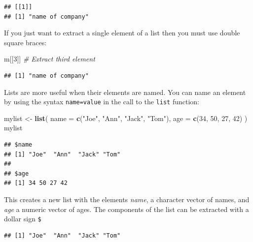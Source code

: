 \documentclass[
]{book}
\newenvironment{Shaded}{\begin{snugshade}}{\end{snugshade}}
\newcommand{\AttributeTok}[1]{\textcolor[rgb]{0.13,0.29,0.53}{#1}}
\newcommand{\CommentTok}[1]{\textcolor[rgb]{0.56,0.35,0.01}{\textit{#1}}}
\newcommand{\DecValTok}[1]{\textcolor[rgb]{0.00,0.00,0.81}{#1}}
\newcommand{\FunctionTok}[1]{\textcolor[rgb]{0.13,0.29,0.53}{\textbf{#1}}}
\newcommand{\NormalTok}[1]{#1}
\newcommand{\OtherTok}[1]{\textcolor[rgb]{0.56,0.35,0.01}{#1}}
\newcommand{\SpecialCharTok}[1]{\textcolor[rgb]{0.81,0.36,0.00}{\textbf{#1}}}
\newcommand{\StringTok}[1]{\textcolor[rgb]{0.31,0.60,0.02}{#1}}
\begin{document}
\begin{verbatim}
## [[1]]
## [1] "name of company"
\end{verbatim}

If you just want to extract a single element of a list then you must use
double square braces:

\begin{Shaded}
\begin{Highlighting}[]
\NormalTok{m[[}\DecValTok{3}\NormalTok{]] }\CommentTok{\# Extract third element}
\end{Highlighting}
\end{Shaded}

\begin{verbatim}
## [1] "name of company"
\end{verbatim}

Lists are more useful when their elements are named. You can name an element
by using the syntax \texttt{name=value} in the call to the \texttt{list} function:

\begin{Shaded}
\begin{Highlighting}[]
\NormalTok{mylist }\OtherTok{\textless{}{-}} \FunctionTok{list}\NormalTok{(}
  \AttributeTok{name =} \FunctionTok{c}\NormalTok{(}\StringTok{"Joe"}\NormalTok{, }\StringTok{"Ann"}\NormalTok{, }\StringTok{"Jack"}\NormalTok{, }\StringTok{"Tom"}\NormalTok{),}
  \AttributeTok{age =} \FunctionTok{c}\NormalTok{(}\DecValTok{34}\NormalTok{, }\DecValTok{50}\NormalTok{, }\DecValTok{27}\NormalTok{, }\DecValTok{42}\NormalTok{)}
\NormalTok{)}
\NormalTok{mylist}
\end{Highlighting}
\end{Shaded}

\begin{verbatim}
## $name
## [1] "Joe"  "Ann"  "Jack" "Tom" 
## 
## $age
## [1] 34 50 27 42
\end{verbatim}

This creates a new list with the elements \emph{name}, a character
vector of names, and \emph{age} a numeric vector of ages. The components
of the list can be extracted with a dollar sign \texttt{\$}

\begin{Shaded}
\end{Shaded}

\begin{verbatim}
## [1] "Joe"  "Ann"  "Jack" "Tom"
\end{verbatim}
\end{document}
